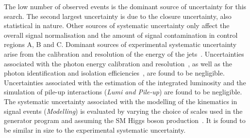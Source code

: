 The low number of observed events is the dominant source of uncertainty for this search.
The second largest uncertainty is due to the closure uncertainty, also statistical in nature.
Other sources of systematic uncertainty only affect the overall signal normalisation and the amount of signal contamination
in control regions A, B and C.
Dominant sources of experimental systematic uncertainty arise from the calibration and resolution of the energy of the 
jets~\cite{PERF-2016-04,PERF-2011-04}. 
Uncertainties associated with the photon energy calibration and resolution~\cite{PERF-2013-05}, as well as the photon identification and isolation
efficiencies~\cite{PERF-2013-04}, are found to be negligible. Uncertainties associated 
with the estimation of the integrated luminosity and the simulation of pile-up interactions (\textit{Lumi and Pile-up})
are found to be negligible. 
The systematic uncertainty associated with the modelling of the kinematics in signal 
events (\textit{Modelling}) is evaluated by varying the choice of scales used in the generator program and
assuming the SM Higgs boson production~\cite{Heinemeyer:2013tqa}.
It is found to be similar in size to the experimental systematic uncertainty.

